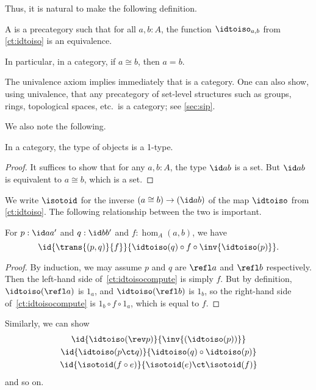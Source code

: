 Thus, it is natural to make the following definition.

\begin{defn}\label{ct:category}
  A 
  is a precategory such that for all $a,b:A$, the function $\idtoiso_{a,b}$ from \cref{ct:idtoiso} is an equivalence.
\end{defn}

In particular, in a category, if $a\cong b$, then $a=b$.

\begin{eg}\label{ct:eg:set}
  The univalence axiom implies immediately that \uset is a category.
  One can also show, using univalence, that any precategory of set-level structures such as groups, rings, topological spaces, etc.\ is a category; see \cref{sec:sip}.
\end{eg}

We also note the following.

\begin{lem}\label{ct:obj-1type}
  In a category, the type of objects is a 1-type.
\end{lem}
\begin{proof}
  It suffices to show that for any $a,b:A$, the type $\id a b$ is a set.
  But $\id a b$ is equivalent to $a \cong b$, which is a set.
\end{proof}

We write $\isotoid$ for the inverse $(a\cong b) \to (\id a b)$ of the map $\idtoiso$ from \cref{ct:idtoiso}.
The following relationship between the two is important.

\begin{lem}\label{ct:idtoiso-trans}
  For $p:\id a a'$ and $q:\id b b'$ and $f:\hom_A(a,b)$, we have
  \begin{equation}\label{ct:idtoisocompute}
    \id{\trans{(p,q)}{f}}
    {\idtoiso(q)\circ f \circ \inv{\idtoiso(p)}}.
  \end{equation}
\end{lem}
\begin{proof}
  By induction, we may assume $p$ and $q$ are $\refl a$ and $\refl b$ respectively.
Then the left-hand side of~\eqref{ct:idtoisocompute} is simply $f$.
  But by definition, $\idtoiso(\refl a)$ is $1_a$, and $\idtoiso(\refl b)$ is $1_b$, so the right-hand side of~\eqref{ct:idtoisocompute} is $1_b\circ f\circ 1_a$, which is equal to $f$.
\end{proof}

Similarly, we can show
\begin{gather}
  \id{\idtoiso(\rev p)}{\inv {(\idtoiso(p))}}\\
  \id{\idtoiso(p\ct q)}{\idtoiso(q)\circ \idtoiso(p)}\\
  \id{\isotoid(f\circ e)}{\isotoid(e)\ct \isotoid(f)}
\end{gather}
and so on.

